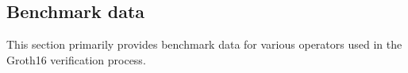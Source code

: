 \subsection{Benchmark data} \label{sec:benchmark-data}

This section primarily provides benchmark data for various operators used in the Groth16 verification process.



